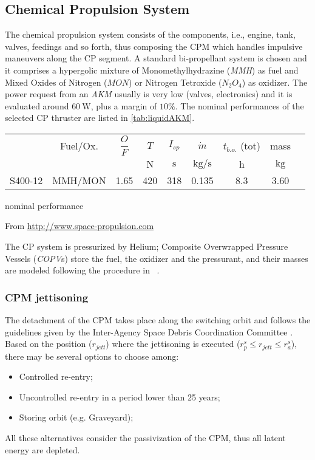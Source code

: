\subsection{Chemical Propulsion System}
\label{subsec:chemicalpropulsionsystem}
The chemical propulsion system consists of the components, i.e., engine, tank, valves, feedings and so forth, thus composing the CPM which handles impulsive maneuvers along the CP segment.
A standard bi-propellant system is chosen and it comprises a hypergolic mixture of Monomethylhydrazine (\textit{MMH}) as fuel and Mixed Oxides of Nitrogen ($MON$) or Nitrogen Tetroxide ($N_2O_4$) as oxidizer. The power request from an \textit{AKM} usually is very low (valves, electronics) and it is evaluated around $60~\si{\watt}$, plus a margin of $10\%$. The nominal performances of the selected CP thruster are listed in \tablename\ref{tab:liquidAKM}.
%
\begin{table*}[htp]
\centering
\caption{\textbf{Liquid \textit{AKM}}}
\label{tab:liquidAKM}
\footnotesize
\begin{threeparttable}
\begin{tabular}{*{9}{c}}
\toprule
\toprule
&Fuel/Ox.&$\dfrac{O}{F}$&$T$&$I_{sp}$&$\dot{m}$&$t_{b.o.}$ (tot)&mass\\
&&&$\si{\newton}$&$\si{\second}$&$\si{\kilo\gram\per\second}$&$\si{\hour}$%
&$\si{\kilo\gram}$\\
\midrule
\footnotesize{S400-12}&\footnotesize{MMH/MON}&1.65&420&318&0.135&8.3&3.60\\
\bottomrule
\bottomrule
\end{tabular}
\begin{tablenotes}
\small
\item[$\star$] nominal performance
\item[$\dagger$] From \url{http://www.space-propulsion.com}
\end{tablenotes}
\end{threeparttable}
\end{table*}
%
The CP system is pressurized by Helium; Composite Overwrapped Pressure Vessels (\textit{COPV}s) store the fuel, the oxidizer and the pressurant, and their masses are modeled following the procedure in \citeauthor{wertz2011space}~\cite{wertz2011space}.
\subsubsection{CPM jettisoning}
The detachment of the CPM takes place along the switching orbit and follows the guidelines given by the Inter-Agency Space Debris Coordination Committee \cite{inter2002iadc}.
Based on the position ($r_{jett}$) where the jettisoning is executed ($r_p^s\le r_{jett}\le r_a^s$), there may be several options to choose among:
\begin{itemize}
\item Controlled re-entry;
\item Uncontrolled re-entry in a period lower than 25 years;
\item Storing orbit (e.g. Graveyard);
\end{itemize}
All these alternatives consider the passivization of the CPM, thus all latent energy are depleted. 
